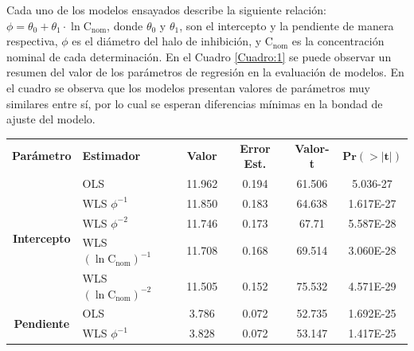 \documentclass{article}
\begin{document}
\noindent
Cada uno de los modelos ensayados describe la siguiente relación: $ \phi = \theta_{0} + \theta_{1}\cdot\ln{\mathrm{C_{nom}}}$, donde $\theta_{0}$ y $\theta_{1} $, son el intercepto y la pendiente de manera respectiva, $ \phi $ es el diámetro del halo de inhibición, y $ \mathrm{C_{nom}} $ es la concentración nominal de cada determinación. En el Cuadro \ref{Cuadro:1} se puede observar un resumen del valor de los parámetros de regresión en la evaluación de modelos. En el cuadro se observa que los modelos presentan valores de parámetros muy similares entre sí, por lo cual se esperan diferencias mínimas en la bondad de ajuste del modelo. \\ 

\begin{table}[H]
	\centering
\begin{tabular}{clcccc}
	\hline
	\multirow{2}{*}{\textbf{Parámetro}}  & \multirow{2}{*}{\textbf{Estimador}}             & \multirow{2}{*}{\textbf{Valor}} & \multirow{2}{*}{\textbf{Error Est.}} & \multirow{2}{*}{\textbf{Valor-t}} & \multirow{2}{*}{$\mathbf{Pr(>|t|)}$} \\
	                                     &                                                 &                                 &                                      &                                   &                                      \\ \hline
	\multirow{5}{*}{\textbf{Intercepto}}  &  OLS                                              & 11.962 & 0.194 & 61.506 & 5.036-27\\
	                                      &  WLS $\phi^{-1}$                                  & 11.850 & 0.183 & 64.638 & 1.617E-27\\
	                                      &  WLS $\phi^{-2}$                                  & 11.746 & 0.173 & 67.71 & 5.587E-28\\
	                                      &  WLS $ \left(\ln{\mathrm{C_{nom}}}\right)^{-1} $  & 11.708 & 0.168 & 69.514 & 3.060E-28\\
	                                      &  WLS $ \left(\ln{\mathrm{C_{nom}}}\right)^{-2} $  & 11.505 & 0.152 & 75.532 & 4.571E-29\\
	\hline
	\multirow{5}{*}{\textbf{Pendiente}}   &  OLS                                              & 3.786 & 0.072 & 52.735 & 1.692E-25\\
	                                      &  WLS $\phi^{-1}$                                  & 3.828 & 0.072 & 53.147 & 1.417E-25\\

\end{tabular}
\end{table}
\end{document}
